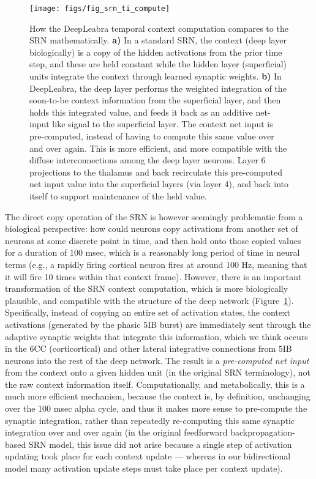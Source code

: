 \documentclass[12pt,twoside]{naturefigs}
\newif\myifpdf
\begin{document}
\begin{figure}
  \centering\texttt{[image: figs/fig\_srn\_ti\_compute]}
  \caption{ How the DeepLeabra temporal context computation compares to the SRN mathematically. {\bf a)} In a standard SRN, the context (deep layer biologically) is a copy of the hidden activations from the prior time step, and these are held constant while the hidden layer (superficial) units integrate the context through learned synaptic weights.  {\bf b)} In DeepLeabra, the deep layer performs the weighted integration of the soon-to-be context information from the superficial layer, and then holds this integrated value, and feeds it back as an additive net-input like signal to the superficial layer.  The context net input is pre-computed, instead of having to compute this same value over and over again.  This is more efficient, and more compatible with the diffuse interconnections among the deep layer neurons.  Layer 6 projections to the thalamus and back recirculate this pre-computed net input value into the superficial layers (via layer 4), and back into itself to support maintenance of the held value.}
  \label{fig.srn_vs_ti}
\end{figure}

The direct copy operation of the SRN is however seemingly problematic from a biological perspective: how could neurons copy activations from another set of neurons at some discrete point in time, and then hold onto those copied values for a duration of 100 msec, which is a reasonably long period of time in neural terms (e.g., a rapidly firing cortical neuron fires at around 100 Hz, meaning that it will fire 10 times within that context frame).  However, there is an important transformation of the SRN context computation, which is more biologically plausible, and compatible with the structure of the deep network (Figure~\ref{fig.srn_vs_ti}). Specifically, instead of copying an entire set of activation states, the context activations (generated by the phasic 5IB burst) are immediately sent through the adaptive synaptic weights that integrate this information, which we think occurs in the 6CC (corticortical) and other lateral integrative connections from 5IB neurons into the rest of the deep network.  The result is a {\em pre-computed net input} from the context onto a given hidden unit (in the original SRN terminology), not the raw context information itself.  Computationally, and metabolically, this is a much more efficient mechanism, because the context is, by definition, unchanging over the 100 msec alpha cycle, and thus it makes more sense to pre-compute the synaptic integration, rather than repeatedly re-computing this same synaptic integration over and over again (in the original feedforward backpropagation-based SRN model, this issue did not arise because a single step of activation updating took place for each context update --- whereas in our bidirectional model many activation update steps must take place per context update).
\end{document}
